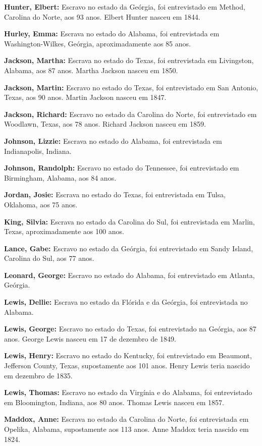 \textbf{Hunter, Elbert:} Escravo no estado da Geórgia, foi entrevistado
em Method, Carolina do Norte, aos 93 anos. Elbert Hunter nasceu em 1844.

\textbf{Hurley, Emma:} Escrava no estado do Alabama, foi entrevistada em
Washington-Wilkes, Geórgia, aproximadamente aos 85 anos.

\textbf{Jackson, Martha:} Escrava no estado do Texas, foi entrevistada
em Livingston, Alabama, aos 87 anos. Martha Jackson nasceu em 1850.

\textbf{Jackson, Martin:} Escravo no estado do Texas, foi entrevistado
em San Antonio, Texas, aos 90 anos. Martin Jackson nasceu em 1847.

\textbf{Jackson, Richard:} Escravo no estado da Carolina do Norte, foi
entrevistado em Woodlawn, Texas, aos 78 anos. Richard Jackson nasceu em
1859.

\textbf{Johnson, Lizzie:} Escrava no estado do Alabama, foi entrevistada
em Indianapolis, Indiana.

\textbf{Johnson, Randolph:} Escravo no estado do Tennessee, foi
entrevistado em Birmingham, Alabama, aos 84 anos.

\textbf{Jordan, Josie:} Escrava no estado do Texas, foi entrevistada em
Tulsa, Oklahoma, aos 75 anos.

\textbf{King, Silvia:} Escrava no estado da Carolina do Sul, foi
entrevistada em Marlin, Texas, aproximadamente aos 100 anos.

\textbf{Lance, Gabe:} Escravo no estado da Geórgia, foi entrevistado em
Sandy Island, Carolina do Sul, aos 77 anos.

\textbf{Leonard, George:} Escravo no estado do Alabama, foi entrevistado
em Atlanta, Geórgia.

\textbf{Lewis, Dellie:} Escrava no estado da Flórida e da Geórgia, foi
entrevistada no Alabama.

\textbf{Lewis, George:} Escravo no estado do Texas, foi entrevistado na
Geórgia, aos 87 anos. George Lewis nasceu em 17 de dezembro de 1849.

\textbf{Lewis, Henry:} Escravo no estado do Kentucky, foi entrevistado
em Beaumont, Jefferson County, Texas, supostamente aos 101 anos. Henry
Lewis teria nascido em dezembro de 1835.

\textbf{Lewis, Thomas:} Escravo no estado da Virgínia e do Alabama, foi
entrevistado em Bloomington, Indiana, aos 80 anos. Thomas Lewis nasceu
em 1857.

\textbf{Maddox, Anne:} Escrava no estado da Carolina do Norte, foi
entrevistada em Opelika, Alabama, supostamente aos 113 anos. Anne Maddox
teria nascido em 1824.

